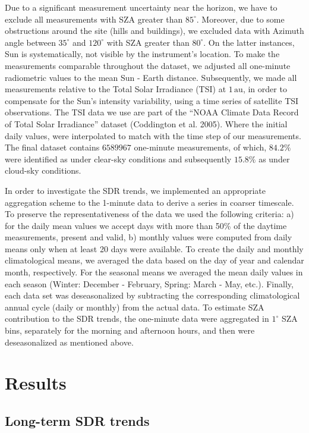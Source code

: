 \documentclass[
]{article}
\begin{document}
Due to a significant measurement uncertainty near the horizon, we have to exclude all measurements with SZA greater than \(85^\circ\).
Moreover, due to some obstructions around the site (hills and buildings), we excluded data with Azimuth angle between
\(35^\circ\) and \(120^\circ\) with SZA greater than \(80^\circ\).
On the latter instances, Sun is systematically, not visible by the instrument's location.
To make the measurements comparable throughout the dataset, we adjusted all one-minute radiometric values to the mean Sun - Earth distance.
Subsequently, we made all measurements relative to the Total Solar Irradiance (TSI) at \(1\,\text{au}\), in order to compensate for the Sun's intensity variability, using a time series of satellite TSI observations.
The TSI data we use are part of the ``NOAA Climate Data Record of Total Solar Irradiance'' dataset (Coddington et al. 2005).
Where the initial daily values, were interpolated to match with the time step of our measurements.
The final dataset contains
\(6589967\)
one-minute measurements, of which,
\(84.2\%\)
were identified as under clear-sky conditions and subsequently
\(15.8\%\)
as under cloud-sky conditions.

In order to investigate the SDR trends, we implemented an appropriate aggregation scheme to the 1-minute data to derive a series in coarser timescale.
To preserve the representativeness of the data we used the following criteria:
a) for the daily mean values we accept days with more than 50\% of the daytime measurements, present and valid,
b) monthly values were computed from daily means
only when at least 20 days were available.
To create the daily and monthly climatological means, we averaged the data based on the day of year and calendar month, respectively.
For the seasonal means we averaged the mean daily values in each season (Winter: December - February, Spring: March - May, etc.).
Finally, each data set was deseasonalized by subtracting the corresponding climatological annual cycle (daily or monthly) from the actual data.
To estimate SZA contribution to the SDR trends, the one-minute data were aggregated in \(1^\circ\) SZA bins, separately for the morning and afternoon hours, and then were deseasonalized as mentioned above.

\hypertarget{results}{%
\section{Results}\label{results}}

\hypertarget{long-term-sdr-trends}{%
\subsection{Long-term SDR trends}\label{long-term-sdr-trends}}
\end{document}
